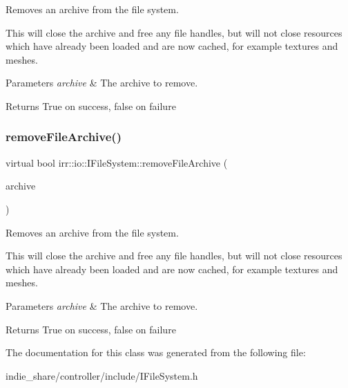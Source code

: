 Removes an archive from the file system. 

This will close the archive and free any file handles, but will not close resources which have already been loaded and are now cached, for example textures and meshes. 
\begin{DoxyParams}{Parameters}
{\em archive} & The archive to remove. \\
\hline
\end{DoxyParams}
\begin{DoxyReturn}{Returns}
True on success, false on failure 
\end{DoxyReturn}
\mbox{\label{classirr_1_1io_1_1IFileSystem_ab7579f5ccca7bc7c1e079f5cb38173ed}} 
\subsubsection{\texorpdfstring{remove\+File\+Archive()}{removeFileArchive()}\hspace{0.1cm}{\footnotesize\ttfamily [6/6]}}
{\footnotesize\ttfamily virtual bool irr\+::io\+::\+I\+File\+System\+::remove\+File\+Archive (\begin{DoxyParamCaption}\item[{const \hyperlink{classirr_1_1io_1_1IFileArchive}{I\+File\+Archive} $\ast$}]{archive }\end{DoxyParamCaption})\hspace{0.3cm}{\ttfamily [pure virtual]}}



Removes an archive from the file system. 

This will close the archive and free any file handles, but will not close resources which have already been loaded and are now cached, for example textures and meshes. 
\begin{DoxyParams}{Parameters}
{\em archive} & The archive to remove. \\
\hline
\end{DoxyParams}
\begin{DoxyReturn}{Returns}
True on success, false on failure 
\end{DoxyReturn}


The documentation for this class was generated from the following file\+:\begin{DoxyCompactItemize}
\item 
indie\+\_\+share/controller/include/I\+File\+System.\+h\end{DoxyCompactItemize}
